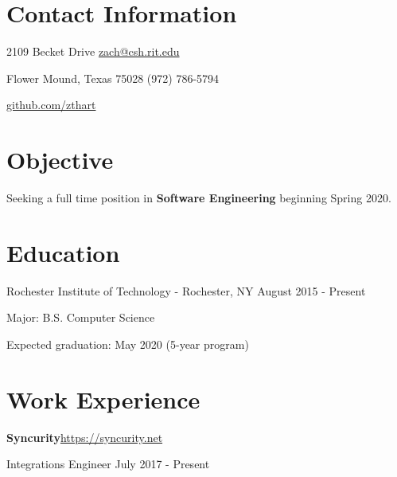 \documentclass[margin,line]{resume}
\newcommand{\rurl}[1]{\hfill {\footnotesize \url{#1}}}
\newcommand{\rdate}[1]{\hfill {\small #1}}
\begin{document}
\begin{resume}
\section{\mysidestyle Contact Information}
	\begin{asparablank}
		\item 2109 Becket Drive  \hfill \href{mailto:zach@csh.rit.edu}{zach@csh.rit.edu}
		\item Flower Mound, Texas 75028 \hfill (972) 786-5794
		\item \hfill \rurl{github.com/zthart}
    \end{asparablank}

\section{\mysidestyle Objective}
	\begin{asparablank}
    	\item Seeking a full time position in \textbf{Software Engineering} beginning Spring 2020.
        \normalsize
        \\
	\end{asparablank}

\section{\mysidestyle Education}
	\begin{compactdesc}
		\item[Rochester Institute of Technology] - Rochester, NY \rdate{August 2015 - Present}
		\begin{compactitem} { \small
			\item Major: B.S. Computer Science
			\item Expected graduation: May 2020 (5-year program)
		} \end{compactitem}
	\end{compactdesc}


\section{\mysidestyle Work Experience}
	\begin{asparablank}
		\item{\bf Syncurity}\rurl{https://syncurity.net}
		\small \item Integrations Engineer \hfill July 2017 - Present \\
         

\end{asparablank}
\end{resume}
\end{document}

